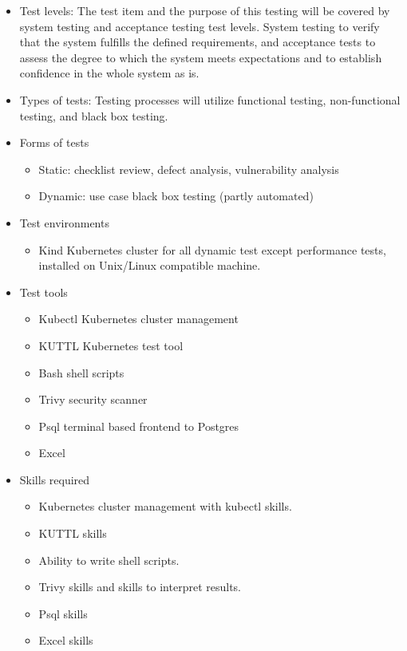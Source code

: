 \begin{itemize}
  \item Test levels: The test item and the purpose of this testing will be covered by system testing and acceptance testing test levels. System testing to verify that the system fulfills the defined requirements, and acceptance tests to assess the degree to which the system meets expectations and to establish confidence in the whole system as is.

  \item Types of tests: Testing processes will utilize functional testing, non-functional testing, and black box testing.

  \item Forms of tests
        \begin{itemize}
          \item Static: checklist review, defect analysis, vulnerability analysis
          \item Dynamic: use case black box testing (partly automated)
        \end{itemize}

  \item Test environments
        \begin{itemize}
          \item Kind Kubernetes cluster for all dynamic test except performance tests, installed on Unix/Linux compatible machine.
        \end{itemize}

  \item Test tools
        \begin{itemize}
          \item Kubectl Kubernetes cluster management
          \item	KUTTL Kubernetes test tool
          \item	Bash shell scripts
          \item	Trivy security scanner
          \item	Psql terminal based frontend to Postgres
          \item	Excel
        \end{itemize}

  \item Skills required
        \begin{itemize}
          \item Kubernetes cluster management with kubectl skills.
          \item	KUTTL skills
          \item	Ability to write shell scripts.
          \item	Trivy skills and skills to interpret results.
          \item	Psql skills
          \item	Excel skills
        \end{itemize}


\end{itemize}
